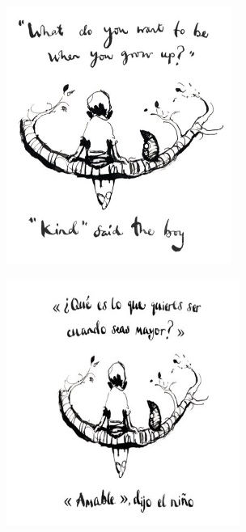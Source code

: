 \documentclass[spanish]{textolivre}
\begin{document}
\begin{figure}[htbp]
\centering
\begin{minipage}[t]{0.32\textwidth}
\includegraphics[width=\linewidth]{Fig4.png}
 \label{fig4}
\end{minipage}
\hspace{1cm}
\begin{minipage}[t]{0.32\textwidth}
\includegraphics[width=\linewidth]{Fig5.png}

\end{minipage}
\end{figure}
\end{document}
